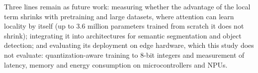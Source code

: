 Three lines remain as future work: measuring whether the advantage of the local term shrinks with pretraining and large datasets, where attention can learn locality by itself (up to 3.6 million parameters trained from scratch it does not shrink); integrating it into architectures for semantic segmentation and object detection; and evaluating its deployment on edge hardware, which this study does not evaluate: quantization-aware training to 8-bit integers and measurement of latency, memory and energy consumption on microcontrollers and NPUs.
